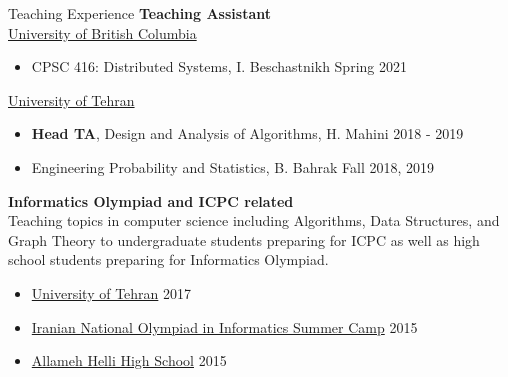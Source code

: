 \documentclass{resume} %
\begin{document}

\begin{rSection}{Teaching Experience}
	{\bf Teaching Assistant}
	\\\href{https://www.ubc.ca/}{University of British Columbia}
	\vspace{-0.5em}
	\begin{itemize}[leftmargin=3mm]
		\setlength{\itemsep}{1pt}
		\setlength{\parskip}{0pt}
		\setlength{\parsep}{0pt}
		\renewcommand\labelitemi{$\cdot$}

		\item CPSC 416: Distributed Systems, I. Beschastnikh \hfill Spring 2021
	\end{itemize}
	
	\href{http://ut.ac.ir/en}{University of Tehran}
	\vspace{-0.5em}
	\begin{itemize}[leftmargin=3mm]
		\setlength{\itemsep}{1pt}
		\setlength{\parskip}{0pt}
		\setlength{\parsep}{0pt}
		\renewcommand\labelitemi{$\cdot$}

		\item {\bf Head TA}, Design and Analysis of Algorithms, H. Mahini \hfill 2018 - 2019 
		\item Engineering Probability and Statistics, B. Bahrak \hfill Fall 2018, 2019
	\end{itemize}
	
	{\bf Informatics Olympiad and ICPC related}
	\\Teaching topics in computer science including Algorithms, Data Structures,
	and Graph Theory to undergraduate students preparing for ICPC as well as high school
	students preparing for Informatics Olympiad.

	\vspace{-0.5em}
	\begin{itemize}[leftmargin=3mm]
		\setlength{\itemsep}{1pt}
		\setlength{\parskip}{0pt}
		\setlength{\parsep}{0pt}
		\renewcommand\labelitemi{$\cdot$}

		\item \href{http://ut.ac.ir/en}{University of Tehran} \hfill 2017
		\item \href{http://inoi.ir/}{Iranian National Olympiad in Informatics Summer Camp} \hfill 2015
		\item \href{http://www.helli.ir/}{Allameh Helli High School} \hfill 2015
	\end{itemize}
\end{rSection}
\end{document}
